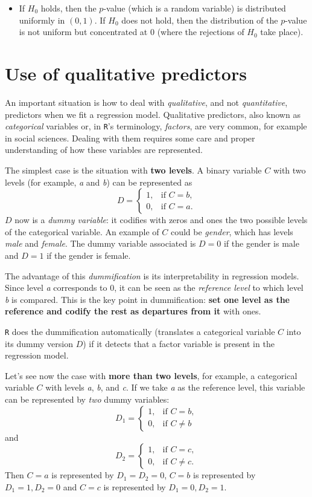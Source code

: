 \documentclass[]{book}
\newenvironment{rmdblock}[1]
  {\begin{shaded*}
  \begin{itemize}
  \renewcommand{\labelitemi}{
    \raisebox{-.7\height}[0pt][0pt]{
      {\setkeys{Gin}{width=2em,keepaspectratio}\texttt{[image: img/icons/\#1]}}
    }
  }
  \item
  }
  {
  \end{itemize}
  \end{shaded*}
  }
\newenvironment{rmdinsight}
  {\begin{rmdblock}{insight}}
  {\end{rmdblock}}
\theoremstyle{definition}
\theoremstyle{definition}
\theoremstyle{definition}
\theoremstyle{remark}
\begin{document}
\begin{rmdinsight}
If \(H_0\) holds, then the \(p\)-value (which is a random variable) is
distributed uniformly in \((0,1)\). If \(H_0\) does not hold, then the
distribution of the \(p\)-value is not uniform but concentrated at \(0\)
(where the rejections of \(H_0\) take place).
\end{rmdinsight}

\chapter{Use of qualitative predictors}\label{use-qual}

An important situation is how to deal with \emph{qualitative}, and not
\emph{quantitative}, predictors when we fit a regression model.
Qualitative predictors, also known as \emph{categorical} variables or,
in \texttt{R}'s terminology, \emph{factors}, are very common, for
example in social sciences. Dealing with them requires some care and
proper understanding of how these variables are represented.

The simplest case is the situation with \textbf{two levels}. A binary
variable \(C\) with two levels (for example, \emph{a} and \emph{b}) can
be represented as \[
D=\left\{\begin{array}{ll}
1,&\text{if }C=b,\\
0,&\text{if }C=a.
\end{array}\right.
\] \(D\) now is a \emph{dummy variable}: it codifies with zeros and ones
the two possible levels of the categorical variable. An example of \(C\)
could be \emph{gender}, which has levels \emph{male} and \emph{female}.
The dummy variable associated is \(D=0\) if the gender is male and
\(D=1\) if the gender is female.

The advantage of this \emph{dummification} is its interpretability in
regression models. Since level \emph{a} corresponds to \(0\), it can be
seen as the \emph{reference level} to which level \emph{b} is compared.
This is the key point in dummification: \textbf{set one level as the
reference and codify the rest as departures from it} with ones.

\texttt{R} does the dummification automatically (translates a
categorical variable \(C\) into its dummy version \(D\)) if it detects
that a factor variable is present in the regression model.

Let's see now the case with \textbf{more than two levels}, for example,
a categorical variable \(C\) with levels \emph{a}, \emph{b}, and
\emph{c}. If we take \emph{a} as the reference level, this variable can
be represented by \emph{two} dummy variables: \[
D_1=\left\{\begin{array}{ll}1,&\text{if }C=b,\\0,& \text{if }C\neq b\end{array}\right.
\] and \[
D_2=\left\{\begin{array}{ll}1,&\text{if }C=c,\\0,& \text{if }C\neq c.\end{array}\right.
\] Then \(C=a\) is represented by \(D_1=D_2=0\), \(C=b\) is represented
by \(D_1=1,D_2=0\) and \(C=c\) is represented by \(D_1=0,D_2=1\).
\end{document}
